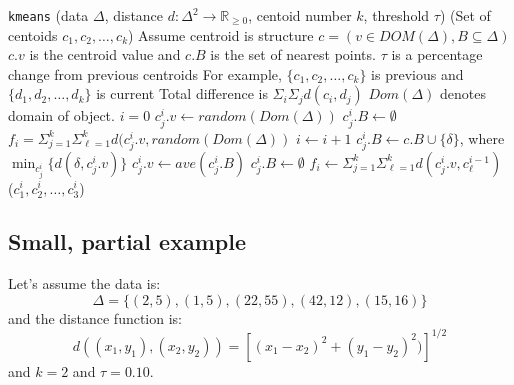 \documentclass{article}
\begin{document}
\begin{center}
\begin{algorithmic}[1]\label{kmeans}
 \texttt{kmeans}
 (\textsf{data} $\Delta$, distance $d:\Delta^2\rightarrow \mathbb{R}_{\geq 0}$, \textsf{centoid number} $k$, \textsf{threshold} $\tau$)
 (\textsf{Set of centoids} $c_1, c_2, \ldots, c_k$)
\State Assume centroid is structure $c = (v \in DOM(\Delta), B\subseteq \Delta)$
\State  $c.v$ is the centroid value and $c.B$ is the set of nearest points.
\State $\tau$ is a percentage change from previous centroids
\State For example, $\{c_1, c_2, \ldots, c_k\}$ is previous and $\{d_1, d_2, \ldots, d_k\}$ is current
\State Total difference is $\Sigma_i \Sigma_j d(c_i, d_j)$
\State $Dom(\Delta)$ denotes domain of object.
\State $i = 0$
\State $c_j^i.v \gets  random(Dom(\Delta))$
\State $c_j^i.B \gets \emptyset$
\EndFor
\State $f_i = \Sigma_{j=1}^k\Sigma_{\ell = 1}^k d(c_j^i.v, random(Dom(\Delta))$
\Repeat
\State $i \gets i + 1$
\For {$\delta \in \Delta$}
\State $c_j^i.B \gets c.B \cup \{\delta\}$, where $\min_{c_j^i}\{d(\delta, c_j^i.v)\}$
\State {}
\EndFor
{}
\State $c_j^i.v \gets ave(c_j^i.B)$
\State $c_j^i.B \gets \emptyset$
\EndFor
\State $f_i \gets \Sigma_{j = 1}^{k}\Sigma_{\ell = 1}^{k}d(c_j^{i}.v, c_\ell^{i-1})$ 
 ($c_1^i, c_2^i, \ldots, c_3^i$) 
\end{algorithmic}
\end{center}
\subsection{Small, partial example}
Let's assume the data is:
\[\Delta = \{  (2, 5),  (1,5) , (22, 55), (42, 12), (15,16)\}\]
and the distance function is:
\[d((x_1, y_1) ,(x_2, y_2)) = [(x_1-x_2)^2 + (y_1 - y_2)^2)]^{1/2}\]
and $k=2$ and $\tau = 0.10$.
\end{document}
